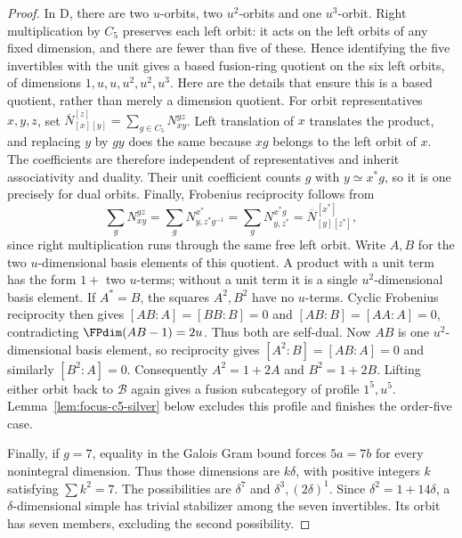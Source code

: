 \begin{proof}
In D, there are two $u$-orbits, two $u^2$-orbits and one $u^3$-orbit.
Right multiplication by $C_5$ preserves each left orbit: it acts on
the left orbits of any fixed dimension, and there are fewer than
five of these. Hence identifying the five invertibles with the
unit gives a based fusion-ring quotient on the six left orbits,
of dimensions $1,u,u,u^2,u^2,u^3$. Here are the details that ensure
this is a based quotient, rather than merely a dimension quotient.
For orbit representatives $x,y,z$, set
$\overline N_{[x][y]}^{[z]}=\sum_{g\in C_5}N_{xy}^{gz}$.
Left translation of $x$ translates the product, and replacing $y$
by $gy$ does the same because $xg$ belongs to the left orbit of $x$.
The coefficients are therefore independent of representatives and
inherit associativity and duality. Their unit coefficient counts
$g$ with $y\simeq x^*g$, so it is one precisely for dual orbits.
Finally, Frobenius reciprocity follows from
\[
 \sum_gN_{xy}^{gz}
 =\sum_gN_{y,z^*g^{-1}}^{x^*}
 =\sum_gN_{y,z^*}^{x^*g}
 =\overline N_{[y][z^*]}^{[x^*]},
\]
since right multiplication runs through the same free left orbit.
Write $A,B$ for the two $u$-dimensional basis elements of this quotient.
A product with a unit term has the form $1+$ two $u$-terms;
without a unit term it is a single $u^2$-dimensional basis element.
If $A^*=B$, the squares $A^2,B^2$ have no $u$-terms. Cyclic
Frobenius reciprocity then gives
$[AB:A]=[BB:B]=0$ and $[AB:B]=[AA:A]=0$, contradicting
$\FPdim(AB-1)=2u$. Thus both are self-dual. Now $AB$ is one
$u^2$-dimensional basis element, so reciprocity gives
$[A^2:B]=[AB:A]=0$ and similarly $[B^2:A]=0$. Consequently
$A^2=1+2A$ and $B^2=1+2B$. Lifting either orbit back to
$\mathcal B$ again gives a fusion subcategory of profile $1^5,u^5$.
Lemma~\ref{lem:focus-c5-silver} below excludes this profile and
finishes the order-five case.

Finally, if $g=7$, equality in the Galois Gram bound forces
$5a=7b$ for every nonintegral dimension. Thus those dimensions are
$k\delta$, with positive integers $k$ satisfying $\sum k^2=7$.
The possibilities are $\delta^7$ and $\delta^3,(2\delta)^1$.
Since $\delta^2=1+14\delta$, a $\delta$-dimensional simple has
trivial stabilizer among the seven invertibles. Its orbit has seven
members, excluding the second possibility.
\end{proof}

